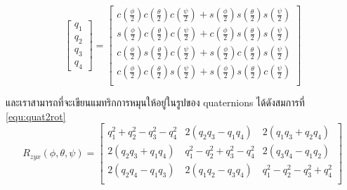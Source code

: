 \begin{equation}
    {\begin{bmatrix} 
    q_1 \\ q_2 \\ q_3 \\ q_4
    \end{bmatrix} = \begin{bmatrix}
        c(\frac{\phi}{2})c(\frac{\theta}{2})c(\frac{\psi}{2})
        + s(\frac{\phi}{2})s(\frac{\theta}{2})s(\frac{\psi}{2}) \\[10pt]
        s(\frac{\phi}{2})c(\frac{\theta}{2})c(\frac{\psi}{2})
        + c(\frac{\phi}{2})s(\frac{\theta}{2})s(\frac{\psi}{2}) \\[10pt]
        c(\frac{\phi}{2})s(\frac{\theta}{2})c(\frac{\psi}{2})
        + s(\frac{\phi}{2})c(\frac{\theta}{2})s(\frac{\psi}{2}) \\[10pt]
        c(\frac{\phi}{2})c(\frac{\theta}{2})s(\frac{\psi}{2})
        + s(\frac{\phi}{2})s(\frac{\theta}{2})c(\frac{\psi}{2}) \\
		\end{bmatrix}}
	\label{equ:euler2quat}
\end{equation}

และเราสามารถที่จะเขียนแมทริกการหมุนให้อยู่ในรูปของ quaternions ได้ดังสมการที่ \ref{equ:quat2rot}
\begin{equation}
    {R_{zyx}(\phi,\theta,\psi) = \begin{bmatrix}
        q_1^2+q_2^2-q_3^2-q_4^2 & 2(q_2q_3-q_1q_4) & 2(q_1q_3+q_2q_4) \\[10pt]
        2(q_2q_3+q_1q_4) & q_1^2-q_2^2+q_3^2-q_4^2 & 2(q_3q_4-q_1q_2) \\[10pt]
        2(q_2q_4-q_1q_3) & 2(q_1q_2-q_3q_4) & q_1^2-q_2^2-q_3^2+q_4^2  \\
       \end{bmatrix}}
	\label{equ:quat2rot}
\end{equation}